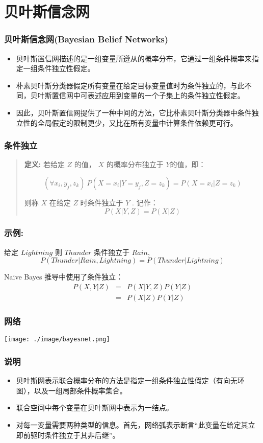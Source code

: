 \documentclass{beamer}
\begin{document}
\section{贝叶斯信念网}
\label{sec-8}
\begin{frame}
\frametitle{贝叶斯信念网(Bayesian Belief Networks)}
\label{sec-8-1}


\begin{itemize}
\item 贝叶斯置信网描述的是一组变量所遵从的概率分布，它通过一组条件概率来指定一组条件独立性假定。
\item 朴素贝叶斯分类器假定所有变量在给定目标变量值时为条件独立的，与此不同，贝叶斯置信网中可表述应用到变量的一个子集上的条件独立性假定。
\item 因此，贝叶斯置信网提供了一种中间的方法，它比朴素贝叶斯分类器中条件独立性的全局假定的限制更少，又比在所有变量中计算条件依赖更可行。
\end{itemize}
\end{frame}
\begin{frame}
\frametitle{条件独立}
\label{sec-8-2}


\begin{quote}
{\bf 定义:} 若给定 $Z$ 的值， $X$ 的概率分布独立于 $Y$的值，即：

$$(\forall x_i,y_j,z_k) \ P(X = x_i | Y = y_j, Z = z_k) =   P(X = x_i | Z = z_k)$$

则称 $X$ 在给定 $Z$ 时条件独立于 $Y$ . 记作：
$$P(X | Y,Z) = P(X | Z)$$
\end{quote}
\end{frame}
\begin{frame}
\frametitle{示例:}
\label{sec-8-3}

给定 $Lightning$ 则 $Thunder$ 条件独立于 $Rain$, 
$$P(Thunder | Rain, Lightning) = P(Thunder | Lightning)$$

Naive Bayes 推导中使用了条件独立：
\begin{eqnarray}
P(X,Y|Z) &= &P(X|Y,Z) P(Y|Z)  \nonumber \\
 &= &P(X|Z) P(Y|Z)  \nonumber
\end{eqnarray}
\end{frame}
\begin{frame}
\frametitle{网络}
\label{sec-8-4}


\texttt{[image: ./image/bayesnet.png]}
\end{frame}
\begin{frame}
\frametitle{说明}
\label{sec-8-5}


\begin{itemize}
\item 贝叶斯网表示联合概率分布的方法是指定一组条件独立性假定（有向无环图），以及一组局部条件概率集合。
\item 联合空间中每个变量在贝叶斯网中表示为一结点。
\item 对每一变量需要两种类型的信息。首先，网络弧表示断言“此变量在给定其立即前驱时条件独立于其非后继”。
\end{itemize}
\end{frame}
\end{document}
